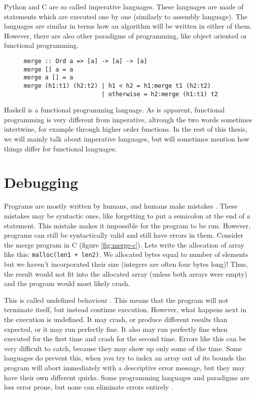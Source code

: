 Python and C are so called imperative languages. These languages are 
made of statements which are executed one by one (similarly to assembly language).
The languages are similar in terms how an algorithm will be written in either of them.
However, there are also other paradigms of programming, like object oriented or functional programming.

\begin{figure}[H]
\begin{verbatim}
merge :: Ord a => [a] -> [a] -> [a]
merge [] a = a
merge a [] = a
merge (h1:t1) (h2:t2) | h1 < h2 = h1:merge t1 (h2:t2)
                      | otherwise = h2:merge (h1:t1) t2
\end{verbatim}
\end{figure}

Haskell is a functional programming language. As is apparent, functional programming is very different from imperative,
altrough the two words sometimes intertwine, for example through higher order functions. In the rest of this thesis, we will
mainly talk about imperative languages, but will sometimes mention how things differ for functional languages.

\section{Debugging}
Programs are mostly written by humans, and humans make mistakes \cite{human-error}. These mistakes may be syntactic ones, like
forgetting to put a semicolon at the end of a statement. This mistake makes it impossible for the program to be run. However,
programs can still be syntactically valid and still have errors in them. Consider the merge program in C (figure \ref{fig:merge-c}).
Lets write the allocation of array like this: \lstinline{malloc(len1 + len2)}. We allocated bytes equal to number of elements
but we haven't incorporated their size (integers are often four bytes long)! Thus, the result would not fit into the allocated
array (unless both arrays were empty) and the program would most likely crash.

This is called undefined behaviour \cite{undefined-behavior}. This means that the program will not terminate itself, but instead continue execution.
However, what happens next in the execution is undefined. It may crash, or produce different results than expected, or
it may run perfectly fine. It also may run perfectly fine when executed for the first time and crash for the second time.
Errors like this can be very difficult to catch, because they may show up only some of the time. Some languages do prevent this,
when you try to index an array out of its bounds the program will abort immediately with a descriptive error message,
but they may have their own different quirks. Some programming languages and paradigms are less error prone, but none 
can eliminate errors entirely \cite{bugs-by-language, bugs-by-language-2}.

